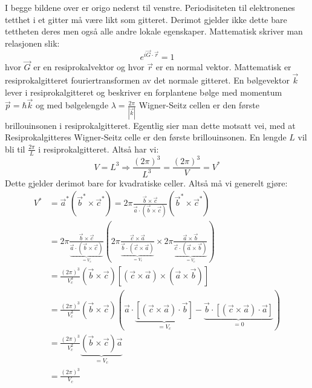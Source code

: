 \documentclass{article}
\begin{document}
I begge bildene over er origo nederst til venstre.
\nyside
{}
Periodisiteten til elektronenes tetthet i et gitter må være likt som gitteret. Derimot gjelder ikke dette bare tettheten deres men også alle andre lokale egenskaper.
Mattematisk skriver man relasjonen slik:
\begin{equation}
    e^{i \vec{G} \cdot \vec{r}} = 1
\end{equation}
hvor $\vec{G}$ er en resiprokalvektor og hvor $\vec{r}$ er en normal vektor. Mattematisk er resiprokalgitteret fouriertransformen av det normale gitteret.
En bølgevektor $\vec{k}$ lever i resiprokalgitteret og beskriver en forplantene bølge med momentum $\vec{p} = \hbar \vec{k}$ og med bølgelengde $\lambda = \frac{2\pi}{|\vec{k}|}$
Wigner-Seitz cellen er den første brillouinsonen i resiprokalgitteret. Egentlig sier man dette motsatt vei, med at Resiprokalgitteres Wigner-Seitz celle er den første brillouinsonen.
En lengde $L$ vil bli til $\frac{2\pi}{L}$ i resiprokalgitteret. Altså har vi:
\begin{equation}
    V = L^3 \Rightarrow \frac{(2\pi)^3}{L^3} = \frac{(2\pi)^3}{V} = V^*
\end{equation}
Dette gjelder derimot bare for kvadratiske celler. Altså må vi generelt gjøre:
\begin{align}
    V^* &= \vec{a}^* \left( \vec{b}^* \times  \vec{c}^*\right) = 2 \pi \frac{\vec{b} \times \vec{c} }{\vec{a} \cdot (\vec{b} \times \vec{c})} \left( \vec{b}^* \times  \vec{c}^*\right) \\
    &= 2 \pi \frac{\vec{b} \times \vec{c} }{\underbrace{\vec{a} \cdot (\vec{b} \times \vec{c})}_{=V_c}} \left(  2 \pi \frac{ \vec{c} \times \vec{a}}{\underbrace{\vec{b} \cdot(\vec{c} \times \vec{a})}_{=V_c}} \times  2 \pi \frac{ \vec{a} \times \vec{b}}{\underbrace{\vec{c} \cdot(\vec{a} \times \vec{b})}_{=V_c}} \right) \\
&= \frac{(2\pi)^3}{V_c^3} (\vec{b} \times \vec{c}) [(\vec{c} \times \vec{a}) \times (\vec{a} \times \vec{b})]\\
&= \frac{(2\pi)^3}{V_c^3} (\vec{b} \times \vec{c}) \left(\vec{a} \cdot \underbrace{[(\vec{c} \times \vec{a})\cdot\vec{b}]}_{=V_c} - \underbrace{\vec{b} \cdot[(\vec{c} \times \vec{a})\cdot\vec{a}]}_{=0}\right)\\
&= \frac{(2\pi)^3}{V_c^2} \underbrace{(\vec{b} \times \vec{c}) \vec{a}}_{=V_c}\\
&= \frac{(2\pi)^3}{V_c}
\end{align}
\end{document}
